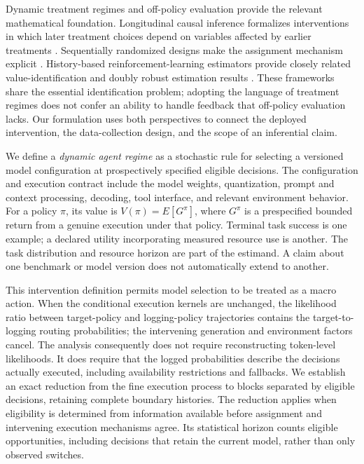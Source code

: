 Dynamic treatment regimes and off-policy evaluation provide the relevant mathematical foundation. Longitudinal causal inference formalizes interventions in which later treatment choices depend on variables affected by earlier treatments \citep{robins1986new,murphy2003optimal}. Sequentially randomized designs make the assignment mechanism explicit \citep{murphy2005smart,klasnja2015mrt}. History-based reinforcement-learning estimators provide closely related value-identification and doubly robust estimation results \citep{jiang2016dr,thomas2016data,kallus2020drl}. These frameworks share the essential identification problem; adopting the language of treatment regimes does not confer an ability to handle feedback that off-policy evaluation lacks. Our formulation uses both perspectives to connect the deployed intervention, the data-collection design, and the scope of an inferential claim.

We define a \emph{dynamic agent regime} as a stochastic rule for selecting a versioned model configuration at prospectively specified eligible decisions. The configuration and execution contract include the model weights, quantization, prompt and context processing, decoding, tool interface, and relevant environment behavior. For a policy $\pi$, its value is $V(\pi)=E[G^{\pi}]$, where $G^{\pi}$ is a prespecified bounded return from a genuine execution under that policy. Terminal task success is one example; a declared utility incorporating measured resource use is another. The task distribution and resource horizon are part of the estimand. A claim about one benchmark or model version does not automatically extend to another.

This intervention definition permits model selection to be treated as a macro action. When the conditional execution kernels are unchanged, the likelihood ratio between target-policy and logging-policy trajectories contains the target-to-logging routing probabilities; the intervening generation and environment factors cancel. The analysis consequently does not require reconstructing token-level likelihoods. It does require that the logged probabilities describe the decisions actually executed, including availability restrictions and fallbacks. We establish an exact reduction from the fine execution process to blocks separated by eligible decisions, retaining complete boundary histories. The reduction applies when eligibility is determined from information available before assignment and intervening execution mechanisms agree. Its statistical horizon counts eligible opportunities, including decisions that retain the current model, rather than only observed switches.

